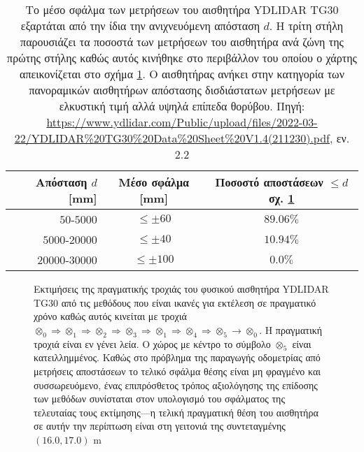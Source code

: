 \begin{table}[h]\centering \vspace{0.5cm}
  \begin{tabular}{rcc}
    Απόσταση $d$ [mm]   & Μέσο σφάλμα [mm]    & Ποσοστό αποστάσεων $\leq d$ σχ. \ref{fig:02_05_04:03} \\ \toprule
    $50$-$5000$         & $\leq \pm 60$       & $89.06\%$  \\
    $5000$-$20000$      & $\leq \pm 40$       & $10.94\%$  \\
    $20000$-$30000$     & $\leq \pm 100$      & $0.0\%$    \\  \bottomrule
  \end{tabular}
  \caption{\small Το μέσο σφάλμα των μετρήσεων του αισθητήρα YDLIDAR TG30
           εξαρτάται από την ίδια την ανιχνευόμενη απόσταση $d$. Η τρίτη στήλη
           παρουσιάζει τα ποσοστά των μετρήσεων του αισθητήρα ανά ζώνη της
           πρώτης στήλης καθώς αυτός κινήθηκε στο περιβάλλον του οποίου ο
           χάρτης απεικονίζεται στο σχήμα \ref{fig:02_05_04:03}. Ο αισθητήρας
           ανήκει στην κατηγορία των πανοραμικών αισθητήρων απόστασης
           δισδιάστατων μετρήσεων με ελκυστική τιμή αλλά υψηλά επίπεδα
           θορύβου. Πηγή: \url{https://www.ydlidar.com/Public/upload/files/2022-03-22/YDLIDAR\%20TG30\%20Data\%20Sheet\%20V1.4(211230).pdf}, εν. 2.2}
  \label{tbl:02:05_04:tg30}
\end{table}

\begin{figure}[]\centering
  
  \vspace{0.25cm}
  \caption{\small Εκτιμήσεις της πραγματικής τροχιάς του φυσικού αισθητήρα
           YDLIDAR TG30 από τις μεθόδους που είναι ικανές για εκτέλεση σε
           πραγματικό χρόνο καθώς αυτός κινείται με τροχιά $\otimes_0
           \Rightarrow \otimes_1 \Rightarrow \otimes_2 \Rightarrow \otimes_3
           \Rightarrow \otimes_1 \Rightarrow \otimes_4 \Rightarrow \otimes_5
           \rightarrow \otimes_0$. Η πραγματική τροχιά είναι εν γένει λεία.
           Ο χώρος με κέντρο το σύμβολο $\otimes_5$ είναι κατειλλημμένος.
           Καθώς στο πρόβλημα της παραγωγής οδομετρίας από μετρήσεις αποστάσεων
           το τελικό σφάλμα θέσης είναι μη φραγμένο και συσσωρευόμενο, ένας
           επιπρόσθετος τρόπος αξιολόγησης της επίδοσης των μεθόδων συνίσταται
           στον υπολογισμό του σφάλματος της τελευταίας τους εκτίμησης---η
           τελική πραγματική θέση του αισθητήρα σε αυτήν την περίπτωση
           είναι στη γειτονιά της συντεταγμένης $(16.0,17.0)$ m}
  \label{fig:02_05_04:03}
\end{figure}


